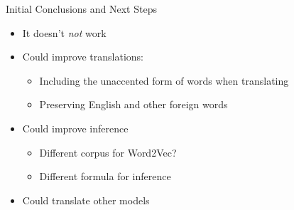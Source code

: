 \documentclass{beamer}
\begin{document}
\begin{frame}{Initial Conclusions and Next Steps}
\begin{itemize}
\item It doesn't \emph{not} work
\item Could improve translations:
\begin{itemize}
\item Including the unaccented form of words when translating
\item Preserving English and other foreign words
\end{itemize}
\item Could improve inference
\begin{itemize}
\item Different corpus for Word2Vec?
\item Different formula for inference
\end{itemize}
\item Could translate other models
\end{itemize}
\end{frame}
\end{document}
